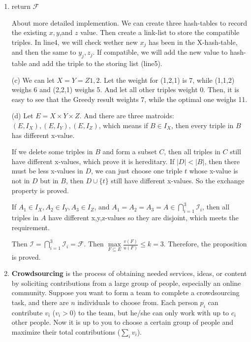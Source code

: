 \documentclass[12pt,a4paper]{article}
\makeatletter
\newtheorem*{solution}{Solution}
\theoremstyle{definition}
\renewenvironment{solution}[1][Solution] {\par\pushQED{\qed}\normalfont\topsep6\p@\@plus6\p@\relax\trivlist\item[\hskip\labelsep\bfseries#1\@addpunct{.}]\ignorespaces}{\popQED\endtrivlist\@endpefalse} \makeatother
\makeatother
\begin{document}
\begin{enumerate}
\begin{solution}
\begin{minipage}[t]{0.95\textwidth}
\begin{algorithm}[H]
   			return $\mathcal{F}$\;
   		\end{algorithm}
   	\end{minipage}
   
   \qquad About more detailed implemention. We can create three hash-tables to record the existing $x,y$,and $z$ value. Then create a link-list to store the compatible triples. In line4, we will check wether new $x_j$ has been in the X-hash-table, and then the same to $y_j, z_j$. If compatible, we will add the new value to hash-table and add the triple to the storing list (line5). 
   
   	\qquad(c) We can let $X=Y=Z{1,2}$. Let the weight for (1,2,1) is 7, while (1,1,2) weighs 6 and (2,2,1) weighs 5. And let all other triples weight 0. Then, it is easy to see that the Greedy result weights 7, while the optimal one weighs 11.
   
   	\qquad(d) Let $E=X\times Y \times Z $. And there are three matroids: $(E,I_X),(E,I_Y),(E,I_Z)$, which means if $B\in I_X$, then every triple in $B$ has different x-value. 
   
   If we delete some triples in $B$ and form a subset $C$, then all triples in $C$ still have different x-values, which prove it is hereditary. If $|D|<|B|$, then there must be less x-values in $D$, we can just choose one triple $t$ whose x-value is not in $D$ but in $B$, then $D\cup\{t\}$ still have different x-values. So the exchange property is proved. 
   
   If $A_1 \in I_X, A_2 \in I_Y, A_3 \in I_Z $, and $A_1=A_2=A_3=A \in \bigcap_{i=1}^{3} \mathcal{I}_{i} $, then all triples in $A$ have different x,y,z-values so they are disjoint, which  meets the requirement.  
   
   Then $\mathcal{I}=\bigcap_{i=1}^{3} \mathcal{I}_{i}=\mathcal{F}$. Then $\max\limits_{F \subseteq E} \frac{v(F)}{u(F)} \leq k=3$. Therefore, the proposition is proved.
   
   
   
   
   
   
   	\end{solution}
 
 



	\item
	\textbf{Crowdsourcing} is the process of obtaining needed services, ideas, or content by soliciting contributions from a large group of people, especially an online community. Suppose you want to form a team to complete a crowdsourcing task, and there are $n$ individuals to choose from. Each person $p_i$ can contribute $v_i$ ($v_i > 0$) to the team, but he/she can only work with up to $c_i$ other people. Now it is up to you to choose a certain group of people and maximize their total contributions ($\sum_i{v_i}$).
	

\end{enumerate}
\end{document}
